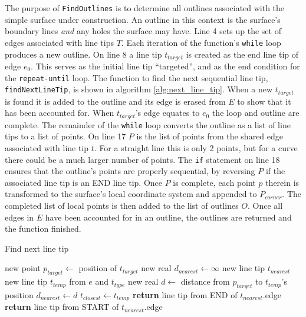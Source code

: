 The purpose of \verb|FindOutlines| is to determine all outlines associated with the simple surface under construction.
An outline in this context is the surface's boundary lines \textit{and} any holes the surface may have.
Line 4 sets up the set of edges associated with line tips $T$.
Each iteration of the function's \verb|while| loop produces a new outline.
On line 8 a line tip $t_{target}$ is created as the end line tip of edge $e_0$.
This serves as the initial line tip ``targeted'', and as the end condition for the \verb|repeat-until| loop.
The function to find the next sequential line tip, \verb|findNextLineTip|, is shown in algorithm \ref{alg:next_line_tip}.
When a new $t_{target}$ is found it is added to the outline and its edge is erased from $E$ to show that it has been accounted for.
When $t_{target}$'s edge equates to $e_0$ the loop and outline are complete.
The remainder of the \verb|while| loop converts the outline as a list of line tips to a list of points.
On line 17 $P$ is the list of points from the shared edge associated with line tip $t$.
For a straight line this is only 2 points, but for a curve there could be a much larger number of points.
The \verb|if| statement on line 18 ensures that the outline's points are properly sequential, by reversing $P$ if the associated line tip is an END line tip.
Once $P$ is complete, each point $p$ therein	is transformed to the surface's local coordinate system and appended to $P_{corner}$.
The completed list of local points is then added to	the list of outlines $O$.
Once all edges in $E$ have been accounted for in an outline, the outlines are returned and the function finished.

\begin{algorithm}[htb]
	\caption{Find next line tip}\label{alg:next_line_tip}
\begin{algorithmic}[1]
	\State new point $p_{target} \leftarrow$ position of $t_{target}$
	\State new real $d_{nearest} \leftarrow \infty$
	\State new line tip $t_{nearest}$
			\State new line tip $t_{temp}$ from $e$ and $t_{type}$
			\State new real $d \leftarrow$ distance from $p_{target}$ to $t_{temp}$'s position
				\State $d_{nearest} \leftarrow d$
				\State $t_{closest} \leftarrow t_{temp}$
			\EndIf
		\EndFor
	\EndFor
		\State \textbf{return} line tip from END of $t_{nearest}$.edge
	\Else
		\State \textbf{return} line tip from START of $t_{nearest}$.edge
	\EndIf
\EndFunction
\end{algorithmic}
\end{algorithm}

